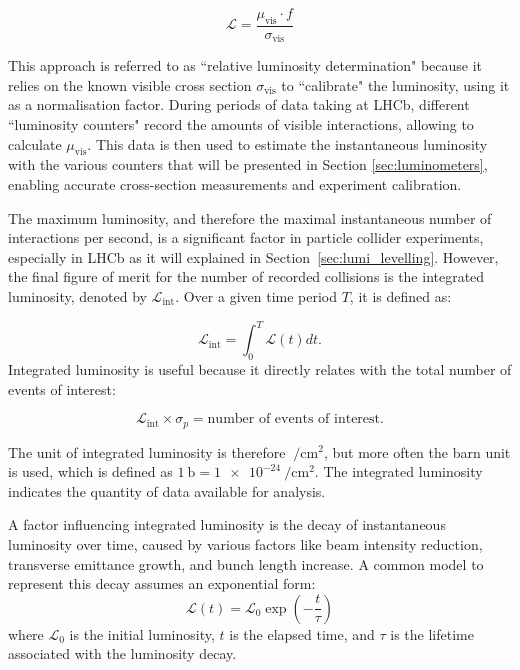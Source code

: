 \begin{equation}\label{rel_lumi}
\mathcal{L} = \frac{\mu_{\text{vis}} \cdot f}{\sigma_{\text{vis}}}
\end{equation}

This approach is referred to as ``relative luminosity determination" because it relies on the known visible cross section $\sigma_{\text{vis}}$ to ``calibrate" the luminosity, using it as a normalisation factor. During periods of data taking at LHCb, different ``luminosity counters" record the amounts of visible interactions, allowing to calculate $\mu_{\text{vis}}$. This data is then used to estimate the instantaneous luminosity with the various counters that will be presented in Section \ref{sec:luminometers}, enabling accurate cross-section measurements and experiment calibration.


The maximum luminosity, and therefore the maximal instantaneous number of interactions per second, is a significant factor in particle collider experiments, especially in LHCb as it will explained in Section~\ref{sec:lumi_levelling}. However, the final figure of merit for the number of recorded collisions is the integrated luminosity, denoted by $\mathcal{L}_{\text{int}}$. Over a given time period $T$, it is defined as:

\begin{equation}
\mathcal{L}_{\text{int}} = \int_0^T \mathcal{L}(t) dt .
\end{equation}
Integrated luminosity is useful because it directly relates with the total number of events of interest:

\begin{equation}
\mathcal{L}_{\text{int}} \times \sigma_p = \text{number of events of interest}.
\end{equation}

The unit of integrated luminosity is therefore $\SI{}{\per\centi\meter\squared}$, but more often the barn unit is used, which is defined as $\SI{1}{\barn}=\SI{1e-24}{\per\centi\meter\squared}$. The integrated luminosity indicates the quantity of data available for analysis.

A factor influencing integrated luminosity is the decay of instantaneous luminosity over time, caused by various factors like beam intensity reduction, transverse emittance growth, and bunch length increase. A common model to represent this decay assumes an exponential form:
\begin{equation}
\mathcal{L}(t) = \mathcal{L}_0 \exp\left( -\frac{t}{\tau} \right)
\end{equation}
where $\mathcal{L}_0$ is the initial luminosity, $t$ is the elapsed time, and $\tau$ is the lifetime associated with the luminosity decay. 

